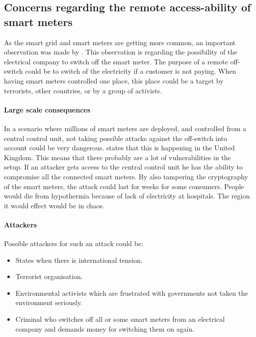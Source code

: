 
\subsection{Concerns regarding the remote access-ability of smart meters}\label{off_switch}
As the smart grid and smart meters are getting more common, an important observation was made by \citet{offswitch}.
This observation is regarding the possibility of the electrical company to switch off the smart meter.
The purpose of a remote off-switch could be to switch of the electricity if a customer is not paying.
When having smart meters controlled one place, this place could be a target by terrorists, other countries, or by a group of activists. 

\paragraph{Large scale consequences}
In a scenario where millions of smart meters are deployed, and controlled from a central control unit, not taking possible attacks against the off-switch into account could be very dangerous.
\citet{offswitch} states that this is happening in the United Kingdom.
This means that there probably are a lot of vulnerabilities in the setup.
If an attacker gets access to the central control unit he has the ability to compromise all the connected smart meters.
By also tampering the cryptography of the smart meters, the attack could last for weeks for some consumers.
People would die from hypothermia because of lack of electricity at hospitals.
The region it would effect would be in chaos.

\paragraph{Attackers}
Possible attackers for such an attack could be:
\begin{itemize}
\item States when there is international tension.
\item Terrorist organisation.
\item Environmental activists which are frustrated with governments not taken the environment seriously.
\item Criminal who switches off all or some smart meters from an electrical company and demands money for switching them on again.
\end{itemize}
